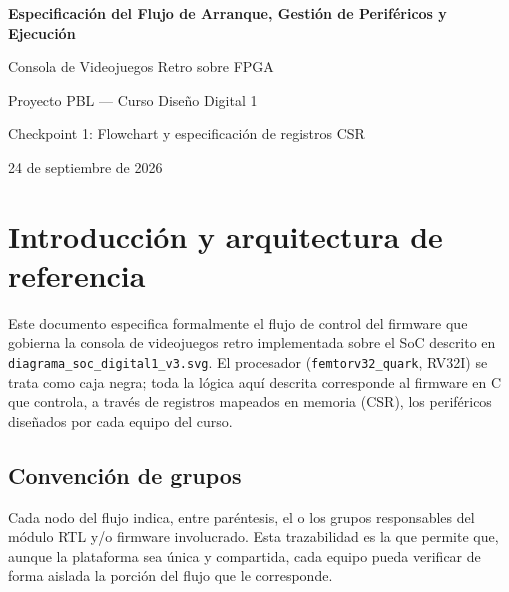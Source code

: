 \documentclass[11pt,a4paper]{article}
\begin{document}
\begin{titlepage}
\centering
\vspace*{2cm}
{\LARGE \bfseries Especificaci\'on del Flujo de Arranque, Gesti\'on de Perif\'ericos y Ejecuci\'on\par}
\vspace{0.5cm}
{\Large Consola de Videojuegos Retro sobre FPGA\par}
\vspace{1.5cm}
{\large Proyecto PBL --- Curso Dise\~no Digital 1\par}
\vspace{0.3cm}
{\large Checkpoint 1: Flowchart y especificaci\'on de registros CSR\par}
\vfill
{\large 24 de septiembre de 2026\par}
\end{titlepage}

\tableofcontents
\newpage

\section{Introducci\'on y arquitectura de referencia}

Este documento especifica formalmente el flujo de control del firmware que gobierna
la consola de videojuegos retro implementada sobre el SoC descrito en
\texttt{diagrama\_soc\_digital1\_v3.svg}. El procesador (\texttt{femtorv32\_quark}, RV32I)
se trata como caja negra; toda la l\'ogica aqu\'i descrita corresponde al firmware en C
que controla, a trav\'es de registros mapeados en memoria (CSR), los perif\'ericos
dise\~nados por cada equipo del curso.

\subsection{Convenci\'on de grupos}
Cada nodo del flujo indica, entre par\'entesis, el o los grupos responsables del
m\'odulo RTL y/o firmware involucrado. Esta trazabilidad es la que permite que, aunque
la plataforma sea \'unica y compartida, cada equipo pueda verificar de forma aislada
la porci\'on del flujo que le corresponde.
\end{document}
